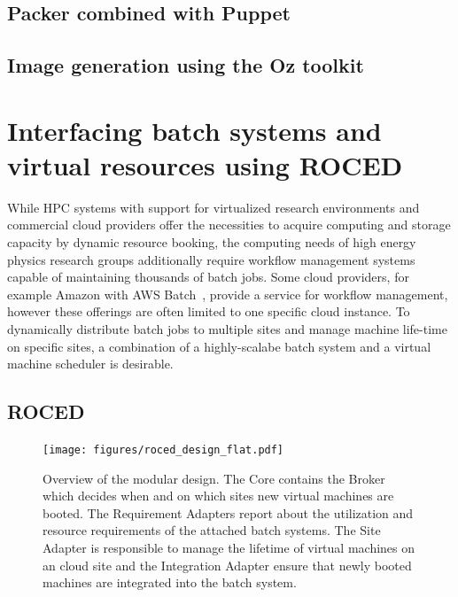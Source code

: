 \subsection{Packer combined with Puppet}





\subsection{Image generation using the Oz toolkit}





\section{Interfacing batch systems and virtual resources using ROCED}
\label{section:roced}
While HPC systems with support for virtualized research environments and commercial cloud providers offer the
necessities to acquire computing and storage capacity by dynamic
resource booking, the computing needs of high energy physics
re\-search groups ad\-di\-tion\-al\-ly require work\-flow
ma\-na\-ge\-ment sys\-tems capable of maintaining thousands of batch
jobs. Some cloud providers, for example Amazon with AWS
Batch~\cite{awsbatch}, provide a service for workflow management,
however these offerings are often limited to one specific cloud instance. To dynamically distribute batch jobs to multiple sites and manage machine life-time on specific sites, a combination of a highly-scalabe batch system and a virtual machine scheduler is desirable.

\subsection{ROCED}
\begin{figure}
\begin{center}
  \texttt{[image: figures/roced\_design\_flat.pdf]}
  \caption{Overview of the \Roced modular design. The  \Roced Core contains the Broker which decides when and on which sites new virtual machines are booted. The Requirement Adapters report about the utilization and resource requirements of the attached batch systems. The Site Adapter is responsible to manage the lifetime of virtual machines on an cloud site and the Integration Adapter ensure that newly booted machines are integrated into the batch system.}
  \label{fig-roced}
\end{center}
\end{figure}

